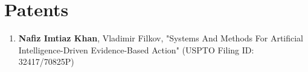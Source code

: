 \section{Patents}
\begin{enumerate}

    \item \textbf{Nafiz Imtiaz Khan}, Vladimir Filkov, "Systems And Methods For Artificial Intelligence-Driven Evidence-Based Action" (USPTO Filing ID: 32417/70825P)

\end{enumerate}
